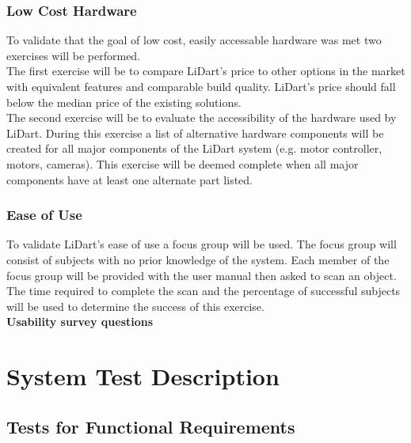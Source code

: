 \documentclass[12pt, titlepage]{article}
\begin{document}
\subsubsection{Low Cost Hardware}

To validate that the goal of low cost, easily accessable hardware was met two exercises will be performed. 
\ \\

\noindent The first exercise will be to compare LiDart's price to other options in the market with equivalent features
and comparable build quality. LiDart's price should fall below the median price of the existing solutions.
\ \\

\noindent The second exercise will be to evaluate the accessibility of the hardware used by LiDart. During
this exercise a list of alternative hardware components will be created for all major components of the LiDart
system (e.g. motor controller, motors, cameras). This exercise will be deemed complete when all major components
have at least one alternate part listed.

\subsubsection{Ease of Use}

To validate LiDart's ease of use a focus group will be used. The focus group will consist of
subjects with no prior knowledge of the system. Each member of the focus group will be provided
with the user manual then asked to scan an object. The time required to complete the scan and the 
percentage of successful subjects will be used to determine the success of this exercise.
\ \\

\noindent \textbf{Usability survey questions}

\section{System Test Description} \label{SysTests}
	
\subsection{Tests for Functional Requirements}

\end{document}
